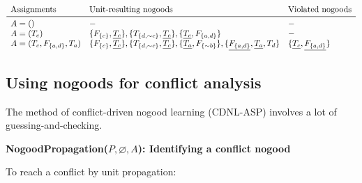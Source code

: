 \documentclass[9pt,a4paper,landscape]{article}
\newcommand{\ngtb}[1]{T_{ \{#1\} }}
\newcommand{\ngfb}[1]{F_{ \{#1\} }}
\newcommand{\ngta}[1]{T_{#1}}
\newcommand{\ngfa}[1]{F_{#1}}
\begin{document}
{\begin{center}
	$\begin{array}{lll}
	\text{Assignments} & \text{Unit-resulting nogoods} & \text{Violated nogoods}\\ \midrule
	A = () & - & - \\
	A = (\ngta{c}) & \{\ngfb{c}, \underline{\ngta{c}}\}, \{\ngtb{d, {\sim} c}, \underline{\ngta{c}}\}, \{\underline{\ngta{c}}, \ngfb{a, d}\} & -\\
	A = (\ngta{c}, \ngfb{a, d}, \ngta{a}) & \{\ngfb{c}, \underline{\ngta{c}}\}, \{\ngtb{d, {\sim} c}, \underline{\ngta{c}}\}, \{\underline{\ngta{a}}, \ngfb{{\sim}b}\}, \{\underline{\ngfb{a, d}}, \underline{\ngta{a}}, \ngta{d}\}
	& \{\underline{\ngta{c}}, \underline{\ngfb{a, d}}\}
\end{array}$
\end{center}


\subsection{Using nogoods for conflict analysis}
\label{subsec:ng-confl}

The method of conflict-driven nogood learning (CDNL-ASP) involves a lot of guessing-and-checking.

\vspace{\baselineskip}
\textbf{NogoodPropagation($P, \varnothing, A$): Identifying a conflict nogood}

To reach a conflict by unit propagation:

}
\end{document}

